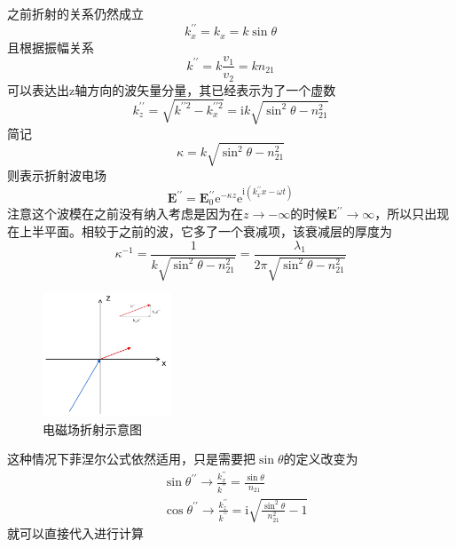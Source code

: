         之前折射的关系仍然成立\[k^{\prime\prime}_x =k_x=k \sin \theta \]且根据振幅关系\[k^{\prime\prime}= k \frac{v_1}{v_2}=k n_{21}\]可以表达出z轴方向的波矢量分量，其已经表示为了一个虚数
        \begin{equation}
            k_{z}^{\prime \prime}=\sqrt{k^{\prime \prime 2}-k_{x}^{\prime \prime 2}}=\mathrm{i} k \sqrt{\sin ^{2} \theta-n_{21}^{2}}
        \end{equation}
        简记\[ \kappa=k \sqrt{\sin ^{2} \theta-n_{21}^{2}}\]则表示折射波电场
        \begin{equation}
            \boldsymbol{E}^{\prime \prime}=\boldsymbol{E}_{0}^{\prime \prime} \mathrm{e}^{-\kappa z} \mathrm{e}^{\mathrm{i}\left(k_{x}^{\prime \prime} x-\omega t\right)}
        \end{equation}
        注意这个波模在之前没有纳入考虑是因为在$z \to -\infty$的时候$ \boldsymbol{E^{\prime \prime} \to \infty}$，所以只出现在上半平面。相较于之前的波，它多了一个衰减项，该衰减层的厚度为
        \begin{equation}
            \kappa^{-1} = \frac{1}{k\sqrt{\sin ^2 \theta - n_{21}^2}}= \frac{\lambda_1}{2 \pi \sqrt{\sin ^2 \theta - n_{21}^2}}
        \end{equation}
        \begin{figure}%
            \centering
            \includegraphics[width=0.34\textwidth]{figs/电磁场折射示意图.jpg}
            \caption*{\footnotesize 电磁场折射示意图}
            \end{figure}

        这种情况下菲涅尔公式依然适用，只是需要把$\sin \theta$的定义改变为
        \begin{equation}
            \begin{aligned}
            &\sin \theta^{\prime \prime} \rightarrow \frac{k_{x}^{\prime \prime}}{k^{\prime \prime}}=\frac{\sin \theta}{n_{21}} \\
            &\cos \theta^{\prime \prime} \rightarrow \frac{k_{z}^{\prime \prime}}{k^{\prime \prime}}=\mathrm{i} \sqrt{\frac{\sin ^{2} \theta}{n_{21}^{2}}-1}
            \end{aligned}
        \end{equation}
        就可以直接代入进行计算

